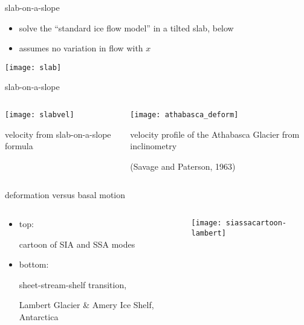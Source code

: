 \documentclass[hide notes,intlimits]{beamer}
\begin{document}
\begin{frame}{slab-on-a-slope}

\begin{itemize}
\item solve the ``standard ice flow model'' in a tilted slab, below
\item assumes no variation in flow with $x$
\end{itemize}

\begin{center}
\texttt{[image: slab]}
\end{center}
\end{frame}


\begin{frame}{slab-on-a-slope}
\vspace{-1em}

\begin{columns}
\begin{column}{0.55\textwidth}
\begin{center}
\texttt{[image: slabvel]}

\medskip
\scriptsize
velocity from slab-on-a-slope formula
\end{center}
\end{column}

\begin{column}{0.45\textwidth}
\texttt{[image: athabasca\_deform]}

\medskip
\scriptsize
velocity profile of the Athabasca Glacier from inclinometry

\tiny (Savage and Paterson, 1963)
\end{column}
\end{columns}
\end{frame}


\begin{frame}{deformation versus basal motion}

\begin{columns}
\begin{column}{0.3\textwidth}
\small
\begin{itemize}
\item \alert{top:}

cartoon of SIA and SSA modes
\item \alert{bottom:}

sheet-stream-shelf transition,

Lambert Glacier \& Amery Ice Shelf, Antarctica
\end{itemize}
\end{column}

\begin{column}{0.7\textwidth}
\texttt{[image: siassacartoon-lambert]}
\end{column}
\end{columns}
\end{frame}
\end{document}
